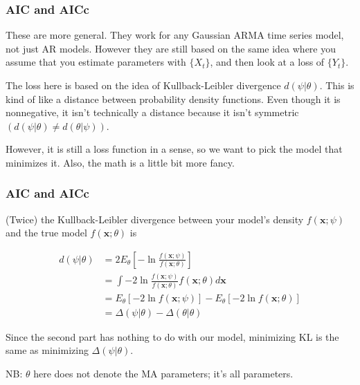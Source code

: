 \documentclass{beamer}
\begin{document}
\begin{frame}[fragile]
\frametitle{AIC and AICc}

These are more general. They work for any Gaussian ARMA time series model, not just AR models. However they are still based on the same idea where you assume that you estimate parameters with $\{X_t\}$, and then look at a loss of $\{Y_t\}$.
\newline

The loss here is based on the idea of Kullback-Leibler divergence $d(\psi|\theta)$. This is kind of like a distance between probability density functions. Even though it is nonnegative, it isn't technically a distance because it isn't symmetric $( d(\psi|\theta) \neq d(\theta|\psi) )$. 
\newline

However, it is still a loss function in a sense, so we want to pick the model that minimizes it. Also, the math is a little bit more fancy.

\end{frame}





\begin{frame}[fragile]
\frametitle{AIC and AICc}

(Twice) the Kullback-Leibler divergence between your model's density $f(\mathbf{x} ; \psi)$ and the true model $f(\mathbf{x} ; \theta)$ is

\begin{align*}
d(\psi|\theta) &= 2 E_{\theta} \left[-\ln \frac{f(\mathbf{x} ; \psi) }{f(\mathbf{x} ; \theta) } \right] \\
&= \int -2 \ln \frac{f(\mathbf{x} ; \psi) }{f(\mathbf{x} ; \theta) } f(\mathbf{x};\theta) d\mathbf{x} \\
&= E_{\theta}\left[ -2 \ln f(\mathbf{x} ; \psi)  \right] - E_{\theta}\left[ -2 \ln  f(\mathbf{x};\theta)\right] \\
&= \Delta(\psi|\theta) - \Delta(\theta|\theta)
\end{align*}

Since the second part has nothing to do with our model, minimizing KL is the same as minimizing $\Delta(\psi|\theta)$.
\newline

NB: $\theta$ here does not denote the MA parameters; it's all parameters.

\end{frame}
\end{document}
